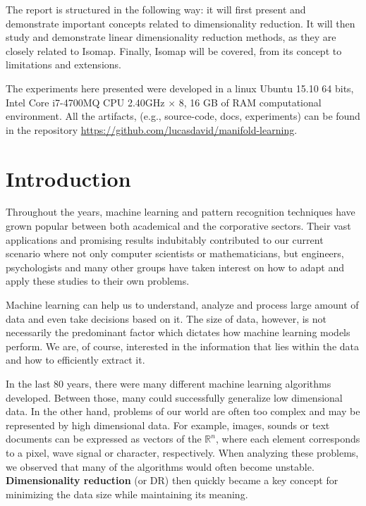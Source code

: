\documentclass[12pt]{article}
\begin{document}
The report is structured in the following way: it will first present and demonstrate important concepts related to dimensionality reduction. It will then study and demonstrate linear dimensionality reduction methods, as they are closely related to Isomap. Finally, Isomap will be covered, from its concept to limitations and extensions.

The experiments here presented were developed in a linux Ubuntu 15.10 64 bits, Intel Core i7-4700MQ CPU 2.40GHz $\times$ 8, 16 GB of RAM computational environment. All the artifacts, (e.g., source-code, docs, experiments) can be found in the repository \url{https://github.com/lucasdavid/manifold-learning}.

\newpage

\section{Introduction}

Throughout the years, machine learning and pattern recognition techniques have grown popular between both academical and the corporative sectors. Their vast applications and promising results indubitably contributed to our current scenario where not only computer scientists or mathematicians, but engineers, psychologists and many other groups have taken interest on how to adapt and apply these studies to their own problems.

Machine learning can help us to understand, analyze and process large amount of data and even take decisions based on it. The size of data, however, is not necessarily the predominant factor which dictates how machine learning models perform. We are, of course, interested in the information that lies within the data and how to efficiently extract it.

In the last 80 years, there were many different machine learning algorithms developed. Between those, many could successfully generalize low dimensional data. \cite{wang2012geometric} In the other hand, problems of our world are often too complex and may be represented by high dimensional data. For example, images, sounds or text documents can be expressed as vectors of the $\mathbb{R}^n$, where each element corresponds to a pixel, wave signal or character, respectively. When analyzing these problems, we observed that many of the algorithms would often become unstable. \textbf{Dimensionality reduction} (or DR) then quickly became a key concept for minimizing the data size while maintaining its meaning.
\end{document}
